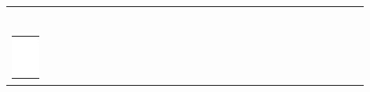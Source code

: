 \documentclass[10pt]{article}
\begin{document}
\begin{center}
\begin{tabular}{|c|c|c|c|c|c|c|c|c|c|c|c|c|c|c|c|c|c|c|c|c|c|c|c|c|c|c|c|c|c|}
\hline
 &  &  &  &  &  &  &  &  &  &  &  &  &  &  &  &  &  &  &  &  &  &  &  &  &  &  &  &  &  \\
\hline
 &  &  &  &  &  &  &  &  &  &  &  &  &  &  &  &  &  &  &  &  &  &  &  &  &  &  &  &  &  \\
\hline
 &  &  &  &  &  &  &  &  &  &  &  &  &  &  &  &  &  &  &  &  &  &  &  &  &  &  &  &  &  \\
\hline
 &  &  &  &  &  &  &  &  &  &  &  &  &  &  &  &  &  &  &  &  &  &  &  &  &  &  &  &  &  \\
\hline
 &  &  &  &  &  &  &  &  &  &  &  &  &  &  &  &  &  &  &  &  &  &  &  &  &  &  &  &  &  \\
\hline
 &  &  &  &  &  &  &  &  &  &  &  &  &  &  &  &  &  &  &  &  &  &  &  &  &  &  &  &  &  \\
\hline
 &  &  &  &  &  &  &  &  &  &  &  &  &  &  &  &  &  &  &  &  &  &  &  &  &  &  &  &  &  \\
\hline
\includegraphics[max width=\textwidth]{2024_11_21_8206013b40ecc9b11a30g-11}

\end{tabular}
\end{center}
\end{document}
